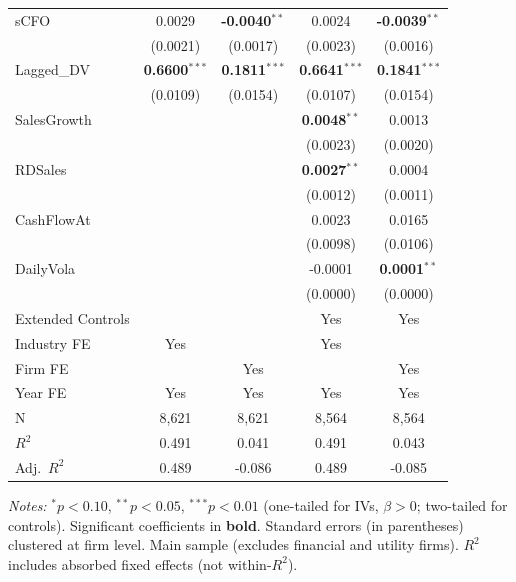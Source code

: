 \begin{landscape}
\begin{table}[H]
\begin{tabular}{lcccc}
sCFO & 0.0029 & \textbf{-0.0040}$^{**}$ & 0.0024 & \textbf{-0.0039}$^{**}$ \\
 & (0.0021) & (0.0017) & (0.0023) & (0.0016) \\
Lagged\_DV & \textbf{0.6600}$^{***}$ & \textbf{0.1811}$^{***}$ & \textbf{0.6641}$^{***}$ & \textbf{0.1841}$^{***}$ \\
 & (0.0109) & (0.0154) & (0.0107) & (0.0154) \\
SalesGrowth &  &  & \textbf{0.0048}$^{**}$ & 0.0013 \\
 &  &  & (0.0023) & (0.0020) \\
RDSales &  &  & \textbf{0.0027}$^{**}$ & 0.0004 \\
 &  &  & (0.0012) & (0.0011) \\
CashFlowAt &  &  & 0.0023 & 0.0165 \\
 &  &  & (0.0098) & (0.0106) \\
DailyVola &  &  & -0.0001 & \textbf{0.0001}$^{**}$ \\
 &  &  & (0.0000) & (0.0000) \\
\midrule
Extended Controls &  &  & Yes & Yes \\
Industry FE & Yes &  & Yes &  \\
Firm FE &  & Yes &  & Yes \\
Year FE & Yes & Yes & Yes & Yes \\
\midrule
N & 8,621 & 8,621 & 8,564 & 8,564 \\
$R^2$ & 0.491 & 0.041 & 0.491 & 0.043 \\
Adj.~$R^2$ & 0.489 & -0.086 & 0.489 & -0.085 \\
\bottomrule
\end{tabular}
\begin{minipage}{\linewidth}
\vspace{2pt}\scriptsize
\textit{Notes:} $^{*}p<0.10$, $^{**}p<0.05$, $^{***}p<0.01$ (one-tailed for IVs, $\beta > 0$; two-tailed for controls).
 Significant coefficients in \textbf{bold}.
 Standard errors (in parentheses) clustered at firm level.
 Main sample (excludes financial and utility firms).
 $R^2$ includes absorbed fixed effects (not within-$R^2$).
\end{minipage}
\end{table}
\end{landscape}